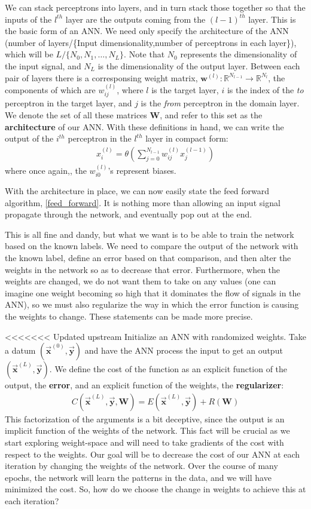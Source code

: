 \documentclass[prl,amsmath,amssymb,floatfix,superscriptaddress,notitlepage,twocolumn]{revtex4}
\newcommand{\ee}[1]{\begin{align} #1 \end{align}} 						%
\newcommand{\vc}[1]{\vec{\mathbf{#1}}} 								%
\begin{document}
We can stack perceptrons into layers, and in turn stack those together so that the inputs of the $l^{th}$ layer are the outputs coming from the $(l-1)^{th}$ layer. This is the basic form of an ANN. We need only specify the architecture of the ANN (number of layers/\{Input dimensionality,number of perceptrons in each layer\}), which will be $L/\{N_0,N_1,\dots,N_L\}$. Note that $N_0$ represents the dimensionality of the input signal, and $N_L$ is the dimensionality of the output layer. Between each pair of layers there is a corresponsing weight matrix, $\textbf{w}^{(l)}:\mathbb{R}^{N_{l-1}}\rightarrow\mathbb{R}^{N_l}$, the components of which are $w_{ij}^{(l)}$, where $l$ is the target layer, $i$ is the index of the \textit{to} perceptron in the target layer, and $j$ is the \textit{from} perceptron in the domain layer. We denote the set of all these matrices \textbf{W}, and refer to this set as the \textbf{architecture} of our ANN. With these definitions in hand, we can write the output of the $i^{th}$ perceptron in the $l^{th}$ layer in compact form:
\ee{
x^{(l)}_i=\theta(\sum_{j=0}^{N_{l-1}}w^{(l)}_{ij}x^{(l-1)}_j)
}
where once again,, the $w^{(l)}_{i0}$'s represent biases. 

With the architecture in place, we can now easily state the feed forward algorithm, \ref{feed_forward}. It is nothing more than allowing an input signal propagate through the network, and eventually pop out at the end.

This is all fine and dandy, but what we want is to be able to train the network based on the known labels. We need to compare the output of the network with the known label, define an error based on that comparison, and then alter the weights in the network so as to decrease that error. Furthermore, when the weights are changed, we do not want them to take on any values (one can imagine one weight becoming so high that it dominates the flow of signals in the ANN), so we must also regularize the way in which the error function is causing the weights to change. These statements can be made more precise.

<<<<<<< Updated upstream
Initialize an ANN with randomized weights. Take a datum $(\vc x^{(0)},\vc y)$ and have the ANN process the input to get an output $(\vc x^{(L)},\vc y)$. We define the cost of the function as an explicit function of the output, the \textbf{error}, and an explicit function of the weights, the \textbf{regularizer}:
\ee{\label{CostFactorization}
C(\vc x^{(L)},\vc y,\textbf{W})=E(\vc x^{(L)},\vc y)+R(\textbf{W})
}
This factorization of the arguments is a bit deceptive, since the output is an implicit function of the weights of the network. This fact will be crucial as we start exploring weight-space and will need to take gradients of the cost with respect to the weights. Our goal will be to decrease the cost of our ANN at each iteration by changing the weights of the network. Over the course of many epochs, the network will learn the patterns in the data, and we will have minimized the cost. So, how do we choose the change in weights to achieve this at each iteration?
\end{document}
